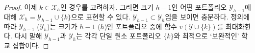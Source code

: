 \documentclass[11pt]{article} %
\newif\ifen
\theoremstyle{definition}
\theoremstyle{definition}
\begin{document}
\begin{proof}
\ifen Now suppose that $k \in \mathcal{X}_h$. We can write $\mathcal{X}_h = \mathcal{Y}_{h-1} \cup \{k\}$, where $ \mathcal{Y}_{h-1}$ is some portfolio of size $h-1$. It suffices to show that $ \mathcal{Y}_{h-1} \subset \mathcal{Y}_h$. By definition, $\mathcal{Y}_{h-1}$ (respectively, $\mathcal{Y}_{h}$) maximizes the function $v(\mathcal{Y}\cup\{k\})$ over portfolios of size $h-1$ (respectively, $h$) that do not include $k$. That is, $\mathcal{Y}_{h-1}$ and $\mathcal{Y}_h$ are the optimal \emph{complements} to the singleton portfolio $\{k\}$.
\else 이제 $k \in \mathcal{X}_h$인 경우를 고려하자. 그러면 크기 $h-1$인 어떤 포트폴리오 $\mathcal{Y}_{h-1}$에 대해 $\mathcal{X}_h = \mathcal{Y}_{h-1} \cup \{k\}$으로 표현할 수 있다. $\mathcal{Y}_{h-1} \subset \mathcal{Y}_h$임을 보이면 충분하다. 정의에 따라 $\mathcal{Y}_{h-1}$ ($\mathcal{Y}_{h}$)는 크기가 $h-1$ ($h$)인 포트폴리오 중에 함수 $v(\mathcal{Y}\cup\{k\})$를 최대화한다. 다시 말해 $\mathcal{Y}_{h-1}$과 $\mathcal{Y}_h$는 각각 단일 원소 포트폴리오 $\{k\}$와 최적으로 `보완적인' 학교 집합이다. \fi


\end{proof}
\end{document}
